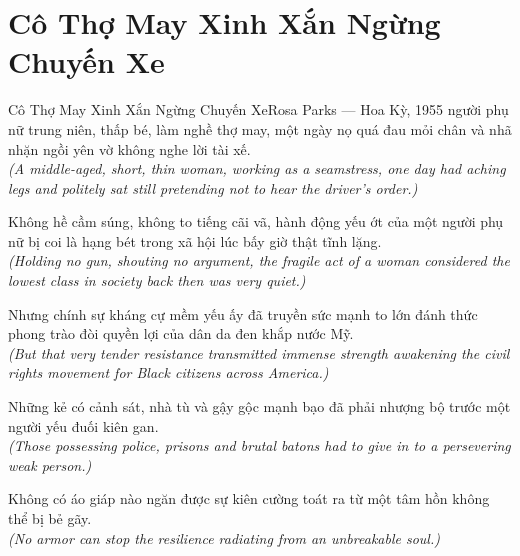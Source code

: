 \section{Cô Thợ May Xinh Xắn Ngừng Chuyến Xe}
\begin{truyen}{Cô Thợ May Xinh Xắn Ngừng Chuyến Xe}{Rosa Parks --- Hoa Kỳ, 1955}
 người phụ nữ trung niên, thấp bé, làm nghề thợ may, một ngày nọ quá đau mỏi chân và nhã nhặn ngồi yên vờ không nghe lời tài xế.\\[4pt]
\textit{(A middle-aged, short, thin woman, working as a seamstress, one day had aching legs and politely sat still pretending not to hear the driver's order.)}

Không hề cầm súng, không to tiếng cãi vã, hành động yếu ớt của một người phụ nữ bị coi là hạng bét trong xã hội lúc bấy giờ thật tĩnh lặng.\\[4pt]
\textit{(Holding no gun, shouting no argument, the fragile act of a woman considered the lowest class in society back then was very quiet.)}

Nhưng chính sự kháng cự mềm yếu ấy đã truyền sức mạnh to lớn đánh thức phong trào đòi quyền lợi của dân da đen khắp nước Mỹ.\\[4pt]
\textit{(But that very tender resistance transmitted immense strength awakening the civil rights movement for Black citizens across America.)}

Những kẻ có cảnh sát, nhà tù và gậy gộc mạnh bạo đã phải nhượng bộ trước một người yếu đuối kiên gan.\\[4pt]
\textit{(Those possessing police, prisons and brutal batons had to give in to a persevering weak person.)}

\end{truyen}
\begin{baihoc}
  Không có áo giáp nào ngăn được sự kiên cường toát ra từ một tâm hồn không thể bị bẻ gãy.\\[4pt]
  \textit{(No armor can stop the resilience radiating from an unbreakable soul.)}
\end{baihoc}


